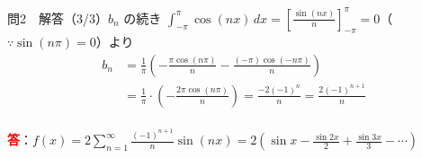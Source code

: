 \documentclass[professionalfonts]{beamer}
\begin{document}
\begin{frame}{問2　解答（3/3）$b_{n}$ の続き}
  $\displaystyle\int_{-\pi}^{\pi}\cos(nx)\,dx = \left[\frac{\sin(nx)}{n}\right]_{-\pi}^{\pi} = 0$\;（$\because \sin(n\pi) = 0$）より\\[6pt]
  \begin{align*}
    b_{n} &= \frac{1}{\pi}\left(-\frac{\pi\cos(n\pi)}{n} - \frac{(-\pi)\cos(-n\pi)}{n}\right) \\[4pt]
    &= \frac{1}{\pi}\cdot\left(-\frac{2\pi\cos(n\pi)}{n}\right)
     = \frac{-2(-1)^{n}}{n}
     = \frac{2(-1)^{n+1}}{n}
  \end{align*}
  \\[8pt]\textcolor{red}{\textbf{答}}：$f(x) = 2\displaystyle\sum_{n=1}^{\infty} \frac{(-1)^{n+1}}{n}\sin(nx) = 2\left(\sin x - \frac{\sin 2x}{2} + \frac{\sin 3x}{3} - \cdots\right)$
\end{frame}
\end{document}
